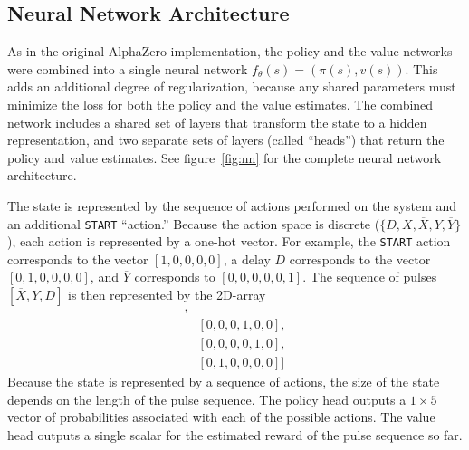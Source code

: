 
\subsection{Neural Network Architecture}

As in the original AlphaZero implementation, the policy and the value networks were combined into a single neural network $f_\theta(s) = (\pi(s), v(s))$. This adds an additional degree of regularization, because any shared parameters must minimize the loss for both the policy and the value estimates. The combined network includes a shared set of layers that transform the state to a hidden representation, and two separate sets of layers (called ``heads'') that return the policy and value estimates. See figure~\ref{fig:nn} for the complete neural network architecture.

The state is represented by the sequence of actions performed on the system and an additional \texttt{START} ``action.''
Because the action space is discrete ($\{ D, X, \overline{X}, Y, \overline{Y} \}$), each action is represented by a one-hot vector. For example, the \texttt{START} action corresponds to the vector $[1,0,0,0,0]$, a delay $D$ corresponds to the vector $[0,1,0,0,0,0]$, and $\overline{Y}$ corresponds to $[0,0,0,0,0,1]$. The sequence of pulses $[\overline{X}, Y, D]$ is then represented by the 2D-array
\begin{align*}
    [&[1,0,0,0,0,0], \\
    &[0,0,0,1,0,0], \\
    &[0,0,0,0,1,0], \\
    &[0,1,0,0,0,0]]
\end{align*}
Because the state is represented by a sequence of actions, the size of the state depends on the length of the pulse sequence.
The policy head outputs a $1 \times 5$ vector of probabilities associated with each of the possible actions. The value head outputs a single scalar for the estimated reward of the pulse sequence so far.

